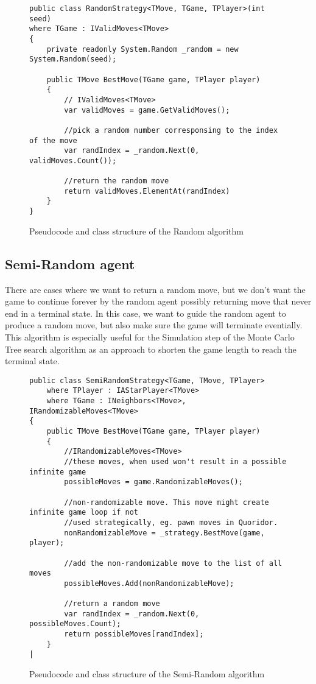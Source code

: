 \begin{figure}[H]
\captionsetup{justification=centering}
\begin{lstlisting}
public class RandomStrategy<TMove, TGame, TPlayer>(int seed)
where TGame : IValidMoves<TMove>
{
    private readonly System.Random _random = new System.Random(seed);
    
    public TMove BestMove(TGame game, TPlayer player)
    {
        // IValidMoves<TMove>
        var validMoves = game.GetValidMoves();

        //pick a random number corresponsing to the index of the move
        var randIndex = _random.Next(0, validMoves.Count());

        //return the random move
        return validMoves.ElementAt(randIndex)
    }
}
\end{lstlisting}
\caption{Pseudocode and class structure of the Random algorithm}
\label{fig:randomAlgo}
\end{figure}

\subsection{Semi-Random agent}

There are cases where we want to return a random move, but we don't want the game to continue forever by the random agent possibly returning move that never end in a terminal state. In this case, we want to guide the random agent to produce a random move, but also make sure the game will terminate eventially. This algorithm is especially useful for the Simulation step of the Monte Carlo Tree search algorithm as an approach to shorten the game length to reach the terminal state.

\begin{figure}[H]
\captionsetup{justification=centering}
\begin{lstlisting}
public class SemiRandomStrategy<TGame, TMove, TPlayer>
    where TPlayer : IAStarPlayer<TMove>
    where TGame : INeighbors<TMove>, IRandomizableMoves<TMove>
{
    public TMove BestMove(TGame game, TPlayer player)
    {
        //IRandomizableMoves<TMove>
        //these moves, when used won't result in a possible infinite game
        possibleMoves = game.RandomizableMoves();

        //non-randomizable move. This move might create infinite game loop if not 
        //used strategically, eg. pawn moves in Quoridor.
        nonRandomizableMove = _strategy.BestMove(game, player);

        //add the non-randomizable move to the list of all moves
        possibleMoves.Add(nonRandomizableMove);

        //return a random move
        var randIndex = _random.Next(0, possibleMoves.Count);
        return possibleMoves[randIndex];
    }
|
\end{lstlisting}
\caption{Pseudocode and class structure of the Semi-Random algorithm}
\label{fig:semiRandomAlgo}
\end{figure}


